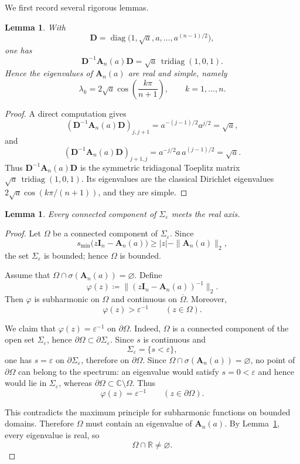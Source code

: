 \documentclass[11pt]{article}
\newtheorem{lemma}[theorem]{Lemma}
\begin{document}
We first record several rigorous lemmas.

\begin{lemma}\label{lem:real-spectrum}
With
\[
\mathbf D=\operatorname{diag}\bigl(1,\sqrt a,a,\dots,a^{(n-1)/2}\bigr),
\]
one has
\[
\mathbf D^{-1}\mathbf A_n(a)\mathbf D
=
\sqrt a\,\operatorname{tridiag}(1,0,1).
\]
Hence the eigenvalues of \(\mathbf A_n(a)\) are real and simple, namely
\[
\lambda_k
=
2\sqrt a\cos\!\left(\frac{k\pi}{n+1}\right),
\qquad
k=1,\dots,n.
\]
\end{lemma}

\begin{proof}
A direct computation gives
\[
(\mathbf D^{-1}\mathbf A_n(a)\mathbf D)_{j,j+1}
=
a^{-(j-1)/2}a^{j/2}
=
\sqrt a,
\]
and
\[
(\mathbf D^{-1}\mathbf A_n(a)\mathbf D)_{j+1,j}
=
a^{-j/2}a\,a^{(j-1)/2}
=
\sqrt a.
\]
Thus \(\mathbf D^{-1}\mathbf A_n(a)\mathbf D\) is the symmetric tridiagonal Toeplitz matrix \(\sqrt a\,\operatorname{tridiag}(1,0,1)\). Its eigenvalues are the classical Dirichlet eigenvalues \(2\sqrt a\cos(k\pi/(n+1))\), and they are simple.
\end{proof}

\begin{lemma}\label{lem:real-axis}
Every connected component of \(\Sigma_\varepsilon\) meets the real axis.
\end{lemma}

\begin{proof}
Let \(\Omega\) be a connected component of \(\Sigma_\varepsilon\). Since
\[
s_{\min}\!\bigl(z\mathbf I_n-\mathbf A_n(a)\bigr)\ge |z|-\|\mathbf A_n(a)\|_2,
\]
the set \(\Sigma_\varepsilon\) is bounded; hence \(\Omega\) is bounded.

Assume that \(\Omega\cap\sigma(\mathbf A_n(a))=\varnothing\). Define
\[
\varphi(z)\coloneqq \bigl\|(z\mathbf I_n-\mathbf A_n(a))^{-1}\bigr\|_2.
\]
Then \(\varphi\) is subharmonic on \(\Omega\) and continuous on \(\overline\Omega\). Moreover,
\[
\varphi(z)>\varepsilon^{-1}
\qquad (z\in\Omega).
\]

We claim that \(\varphi(z)=\varepsilon^{-1}\) on \(\partial\Omega\). Indeed, \(\Omega\) is a connected component of the open set \(\Sigma_\varepsilon\), hence \(\partial\Omega\subset \partial\Sigma_\varepsilon\). Since \(s\) is continuous and
\[
\Sigma_\varepsilon=\{s<\varepsilon\},
\]
one has \(s=\varepsilon\) on \(\partial\Sigma_\varepsilon\), therefore on \(\partial\Omega\). Since \(\Omega\cap\sigma(\mathbf A_n(a))=\varnothing\), no point of \(\partial\Omega\) can belong to the spectrum: an eigenvalue would satisfy \(s=0<\varepsilon\) and hence would lie in \(\Sigma_\varepsilon\), whereas \(\partial\Omega\subset \mathbb C\setminus \Omega\). Thus
\[
\varphi(z)=\varepsilon^{-1}
\qquad (z\in\partial\Omega).
\]

This contradicts the maximum principle for subharmonic functions on bounded domains. Therefore \(\Omega\) must contain an eigenvalue of \(\mathbf A_n(a)\). By Lemma~\ref{lem:real-spectrum}, every eigenvalue is real, so
\[
\Omega\cap\mathbb R\neq\varnothing.
\]
\end{proof}
\end{document}
